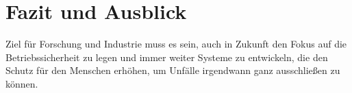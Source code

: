 \chapter{Fazit und Ausblick}
Ziel für Forschung und Industrie muss es sein, auch in Zukunft den Fokus auf die Betriebssicherheit zu legen und immer weiter Systeme zu entwickeln, die den Schutz für den Menschen erhöhen, um Unfälle irgendwann ganz ausschließen zu können.
